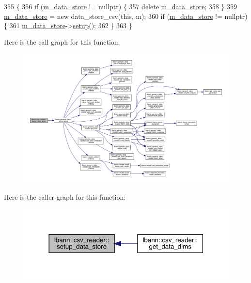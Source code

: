 \begin{DoxyCode}
355                                           \{
356   \textcolor{keywordflow}{if} (\hyperlink{classlbann_1_1generic__data__reader_aefc076b842933a882214f4f709ca49c9}{m\_data\_store} != \textcolor{keyword}{nullptr}) \{
357     \textcolor{keyword}{delete} \hyperlink{classlbann_1_1generic__data__reader_aefc076b842933a882214f4f709ca49c9}{m\_data\_store};
358   \}
359   \hyperlink{classlbann_1_1generic__data__reader_aefc076b842933a882214f4f709ca49c9}{m\_data\_store} = \textcolor{keyword}{new} data\_store\_csv(\textcolor{keyword}{this}, m);
360   \textcolor{keywordflow}{if} (\hyperlink{classlbann_1_1generic__data__reader_aefc076b842933a882214f4f709ca49c9}{m\_data\_store} != \textcolor{keyword}{nullptr}) \{
361     \hyperlink{classlbann_1_1generic__data__reader_aefc076b842933a882214f4f709ca49c9}{m\_data\_store}->\hyperlink{classlbann_1_1generic__data__store_a1cff17def02ee21b6ca0befeb04bb582}{setup}();
362   \}
363 \}
\end{DoxyCode}
Here is the call graph for this function\+:\nopagebreak
\begin{figure}[H]
\begin{center}
\leavevmode
\includegraphics[width=350pt]{classlbann_1_1csv__reader_a19175c31963be64ea602d49cfb37bc68_cgraph}
\end{center}
\end{figure}
Here is the caller graph for this function\+:\nopagebreak
\begin{figure}[H]
\begin{center}
\leavevmode
\includegraphics[width=318pt]{classlbann_1_1csv__reader_a19175c31963be64ea602d49cfb37bc68_icgraph}
\end{center}
\end{figure}
\mbox{\label{classlbann_1_1csv__reader_afc689f206192339770ee9fbd132492bb}} 
